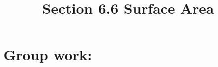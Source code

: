 \documentclass[noinstructornotes]{ximera}
\title{Section 6.6 Surface Area}
\begin{document}
\begin{abstract}		\end{abstract}
\maketitle



\begin{comment}
\section{Warm up:}

	\begin{freeResponse}
	
	\end{freeResponse}
	
\begin{instructorNotes}

\end{instructorNotes}
\end{comment}







\section{Group work:}
\end{document}
